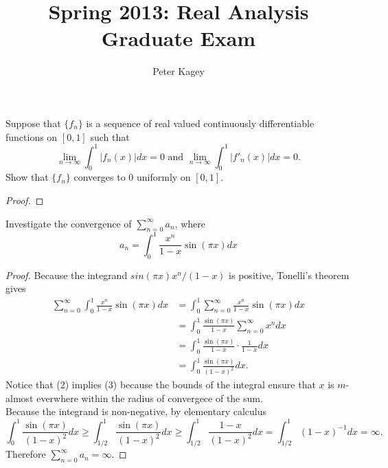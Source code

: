\documentclass{article}
\newenvironment{problem}[2][Problem]{\begin{trivlist}
\item[\hskip \labelsep {\bfseries #1}\hskip \labelsep {\bfseries #2.}]}{\end{trivlist}}
\begin{document}
\title{Spring 2013: Real Analysis Graduate Exam}
\author{Peter Kagey}

\maketitle

\begin{problem}{1}
  Suppose that $\{ f_n \}$ is a sequence of real valued continuously
  differentiable functions on $[0, 1]$ such that \[
    \lim_{n \rightarrow \infty} \int_0^1 |f_n(x)| dx = 0
    \text{ and }
    \lim_{n \rightarrow \infty} \int_0^1 |f'_n(x)| dx = 0.
  \]
  Show that $\{ f_n \}$ converges to 0 uniformly on $[0, 1]$.
\end{problem}

\begin{proof}
\end{proof}

\pagebreak

\begin{problem}{2}
  Investigate the convergence of $\sum_{n=0}^\infty a_n$, where \[
    a_n = \int_0^1 \frac{x^n}{1 - x}\sin(\pi x) dx
  \]
\end{problem}

\begin{proof}
  Because the integrand $sin(\pi x)x^n/(1-x)$ is positive, Tonelli's theorem
  gives \begin{align}
    \sum_{n=0}^\infty \int_0^1 \frac{x^n}{1 - x}\sin(\pi x) dx &=
    \int_0^1 \sum_{n=0}^\infty \frac{x^n}{1 - x}\sin(\pi x) dx \\ &=
    \int_0^1 \frac{\sin(\pi x)}{1 - x} \sum_{n=0}^\infty x^n dx \\ &=
    \int_0^1 \frac{\sin(\pi x)}{1 - x} \cdot \frac{1}{1 - x} dx \\ &=
    \int_0^1 \frac{\sin(\pi x)}{(1 - x)^2} dx.
  \end{align}
  Notice that (2) implies (3) because the bounds of the integral ensure that $x$
  is $m$-almost everwhere within the radius of convergece of the sum. \\

  Because the integrand is non-negative, by elementary calculus \[
    \int_0^1 \frac{\sin(\pi x)}{(1 - x)^2} dx \geq
    \int_{1/2}^1 \frac{\sin(\pi x)}{(1 - x)^2} dx \geq
    \int_{1/2}^1 \frac{1 - x}{(1 - x)^2} dx =
    \int_{1/2}^1 (1 - x)^{-1} dx =
    \infty.
  \] Therefore $\sum_{n=0}^\infty a_n = \infty$.
\end{proof}
\end{document}
